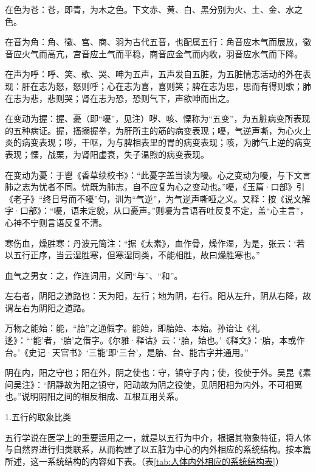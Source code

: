 \documentclass[12pt]{ctexbook}
\begin{document}
\begin{jiaozhu}
  \item 在色为苍：苍，即青，为木之色。下文赤、黄、白、黑分别为火、土、金、水之色。
  \item 在音为角：角、徵、宫、商、羽为古代五音，也配属五行：角音应木气而展放，徵音应火气而高亢，宫音应土气而平稳，商音应金气而内收，羽音应水气而下降。
  \item 在声为呼：呼、笑、歌、哭、呻为五声，五声发自五脏，为五脏情志活动的外在表现：肝在志为怒，怒则呼；心在志为喜，喜则笑；脾在志为思，思而有得则歌；肺在志为悲，悲则哭；肾在志为恐，恐则气下，声欲呻而出之。
  \item 在变动为握：握、憂（即“嚘”，见注）哕、咳、慄称为“五变”，为五脏病变所表现的五种病证。握，搐搦握拳，为肝所主的筋的病变表现；嚘，气逆声嘶，为心火上炎的病变表现；哕，干呕，为与脾相表里的胃的病变表现；咳，为肺气上逆的病变表现；慄，战栗，为肾阳虚衰，失子温煦的病变表现。
  \item 在变动为憂：于鬯《香草续校书》：“此憂字盖当读为嚘。心之变动为嚘，与下文言肺之志为忧者不同。忧既为肺志，自不应复为心之变动也。”嚘，《玉篇·口部》引《老子》“终日号而不嚘”句，训为“气逆”，为气逆声嘶哑之义。又释：按《说文解字·口部》：“嚘，语未定貌，从口憂声。”则嚘为言语吞吐反复不定，盖“心主言”，心神不宁则言语反复不清。
  \item 寒伤血，燥胜寒：丹波元筒注：“据《太素》，血作骨，燥作湿，为是，张云：‘若以五行正序，当云湿胜寒，但寒湿同类，不能相胜，故曰燥胜寒也。”
  \item 血气之男女：之，作连词用，义同“与”、“和”。
  \item 左右者，阴阳之道路也：天为阳，左行；地为阴，右行。阳从左升，阴从右降，故谓左右为阴阳之道路。
  \item 万物之能始：能，“胎”之通假字。能始，即胎始、本始。孙诒让《礼迻》：“‘能’者，‘胎’之借字。《尔雅·释诂》云：‘胎，始也。’《释文》：‘胎，本或作台。’《史记·天官书》‘三能’即‘三台’，是胎、台、能古字并通用。”
  \item 阴在内，阳之守也；阳在外，阴之使也：守，镇守子内；使，役使于外。吴昆《素问吴注》：“阴静故为阳之镇守，阳动故为阴之役使，见阴阳相为内外，不可相离也。”说明阴阳之间的相反相成、互根互用关系。
\end{jiaozhu}


1.五行的取象比类

五行学说在医学上的重要运用之一，就是以五行为中介，根据其物象特征，将人体与自然界进行归类联系，从而构建了以五脏为中心的内外相应的系统结构。按本篇所述，这一系统结构的内容如下表。（表\ref{tab:人体内外相应的系统结构表}）
\end{document}
